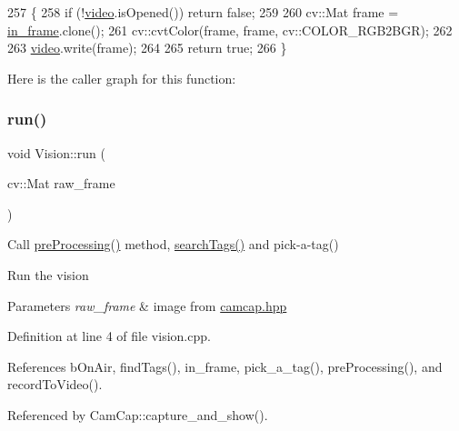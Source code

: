 \begin{DoxyCode}
257                            \{
258     \textcolor{keywordflow}{if} (!\hyperlink{class_vision_a65230f76c9af171a0a9faba81b57f3d5}{video}.isOpened()) \textcolor{keywordflow}{return} \textcolor{keyword}{false};
259 
260     cv::Mat frame = \hyperlink{class_vision_a905e6a0333e4931dfd2e0e44b07b51c9}{in\_frame}.clone();
261     cv::cvtColor(frame, frame, cv::COLOR\_RGB2BGR);
262 
263     \hyperlink{class_vision_a65230f76c9af171a0a9faba81b57f3d5}{video}.write(frame);
264 
265     \textcolor{keywordflow}{return} \textcolor{keyword}{true};
266 \}
\end{DoxyCode}
Here is the caller graph for this function\+:
\mbox{\label{class_vision_a8d7335b29584429ff5b5c24958896b08}} 
\subsubsection{\texorpdfstring{run()}{run()}}
{\footnotesize\ttfamily void Vision\+::run (\begin{DoxyParamCaption}\item[{cv\+::\+Mat}]{raw\+\_\+frame }\end{DoxyParamCaption})}



Call \hyperlink{class_vision_a6d23298e695a938d2491ae1f6264c694}{pre\+Processing()} method, \hyperlink{class_vision_a717cabba99a7e8d5613df6dc699e31fe}{search\+Tags()} and pick-\/a-\/tag() 

Run the vision 
\begin{DoxyParams}{Parameters}
{\em raw\+\_\+frame} & image from \hyperlink{camcap_8hpp}{camcap.\+hpp} \\
\hline
\end{DoxyParams}


Definition at line 4 of file vision.\+cpp.



References b\+On\+Air, find\+Tags(), in\+\_\+frame, pick\+\_\+a\+\_\+tag(), pre\+Processing(), and record\+To\+Video().



Referenced by Cam\+Cap\+::capture\+\_\+and\+\_\+show().


